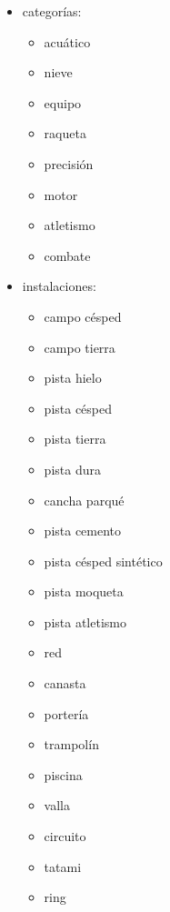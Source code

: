 \begin{itemize}
\item categorías:
	\begin{itemize}
	\item acuático
	\item nieve
	\item equipo
	\item raqueta
	\item precisión
	\item motor
	\item atletismo
	\item combate
	\end{itemize}
	
\item instalaciones:
	\begin{itemize}
	\item campo césped
	\item campo tierra
	\item pista hielo
	\item pista césped
	\item pista tierra
	\item pista dura
	\item cancha parqué
	\item pista cemento
	\item pista césped sintético
	\item pista moqueta
	\item pista atletismo
	\item red
	\item canasta
	\item portería
	\item trampolín
	\item piscina
	\item valla
	\item circuito
	\item tatami
	\item ring
	\end{itemize}
	

\end{itemize}
